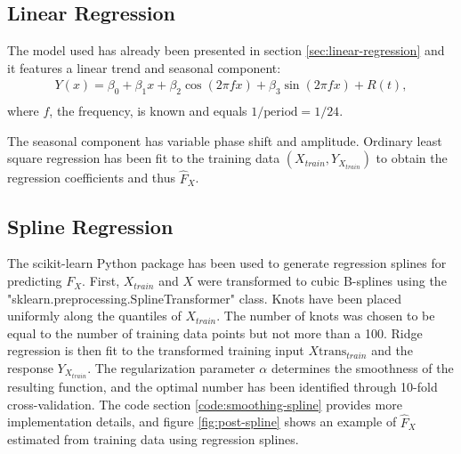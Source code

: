 \subsection{Linear Regression}

The model used has already been presented in section \ref{sec:linear-regression} and
it features a linear trend and seasonal component:
\begin{gather*}
Y(x) = \beta_0 + \beta_1 x + \beta_2 \cos(2 \pi f x) + \beta_3 \sin(2 \pi f x) + R(t), \\
\end{gather*}
where $f$, the frequency, is known and equals $1/\text{period} = 1/24$.

The seasonal component has variable phase shift and amplitude.
Ordinary least square regression has been fit to the training data
$(X_{train}, Y_{X_{train}})$ to obtain the regression coefficients and thus
$\hat{F}_X$.
%

\subsection{Spline Regression}

The scikit-learn Python package has been used to
generate regression splines for predicting $F_X$.
First, $X_{train}$ and $X$ were transformed to cubic B-splines using the \\
"sklearn.preprocessing.SplineTransformer" class.
Knots have been placed uniformly along the quantiles of $X_{train}$.
The number of knots was chosen to be equal to the number of training
data points but not more than a 100. Ridge regression is then fit to the transformed training
input $X\text{trans}_{train}$ and the response $Y_{X_{train}}$.
The regularization parameter $\alpha$ determines the smoothness of the resulting function,
and the optimal number has been identified through 10-fold
cross-validation.
The code section \ref{code:smoothing-spline} provides more implementation details,
and figure \ref{fig:post-spline} shows an example of $\hat{F}_X$ estimated
from training data using regression splines.

